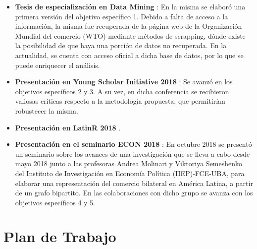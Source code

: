 \documentclass[runningheads,a4paper]{llncs}
\begin{document}
\begin{itemize}
	\item \textbf{Tesis de especialización en Data Mining} \citep{Kozlowski2018b}: En la misma se elaboró una primera versión del objetivo específico 1. Debido a falta de acceso a la información, la misma fue recuperada de la página web de la Organización Mundial del comercio (WTO) mediante métodos de scrapping, dónde existe la posibilidad de que haya una porción de datos no recuperada. En la actualidad, se cuenta con acceso oficial a dicha base de datos, por lo que se puede enriquecer el análisis.\\
	\item \textbf{Presentación en Young Scholar Initiative 2018} \citep{Kozlowski2018a}: Se avanzó en los objetivos específicos 2 y 3. A su vez, en dicha conferencia se recibieron valiosas críticas respecto a la metodología propuesta, que permitirían robustecer la misma.\\
	\item \textbf{Presentación en LatinR 2018} \citep{Kozlowski2018}.\\
	\item \textbf{Presentación en el seminario ECON 2018} : En octubre 2018 se presentó un seminario sobre los avances de una investigación que se lleva a cabo desde mayo 2018 junto a las profesoras Andrea Molinari y Viktoriya Semeshenko del Instituto de Investigación en Economía Política (IIEP)-FCE-UBA, para elaborar una representación del comercio bilateral en América Latina, a partir de un grafo bipartito. En las colaboraciones con dicho grupo se avanza con los objetivos específicos 4 y 5.
\end{itemize}



\section{Plan de Trabajo}

\end{document}
